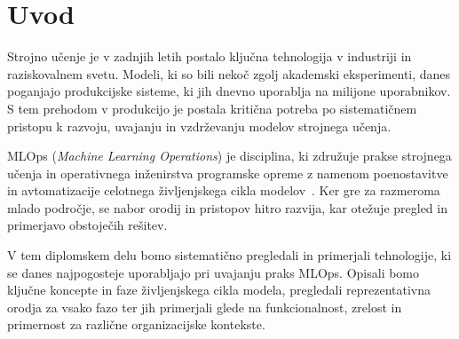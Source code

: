 \chapter{Uvod}

Strojno učenje je v zadnjih letih postalo ključna tehnologija v industriji in raziskovalnem svetu.
Modeli, ki so bili nekoč zgolj akademski eksperimenti, danes poganjajo produkcijske sisteme, ki jih
dnevno uporablja na milijone uporabnikov. S tem prehodom v produkcijo je postala kritična potreba
po sistematičnem pristopu k razvoju, uvajanju in vzdrževanju modelov strojnega učenja.

MLOps (\textit{Machine Learning Operations}) je disciplina, ki združuje prakse strojnega učenja in
operativnega inženirstva programske opreme z namenom poenostavitve in avtomatizacije celotnega
življenjskega cikla modelov~\cite{Kreuzberger2023}. Ker gre za razmeroma mlado področje, se nabor
orodij in pristopov hitro razvija, kar otežuje pregled in primerjavo obstoječih rešitev.

V tem diplomskem delu bomo sistematično pregledali in primerjali tehnologije, ki se danes
najpogosteje uporabljajo pri uvajanju praks MLOps. Opisali bomo ključne koncepte in faze
življenjskega cikla modela, pregledali reprezentativna orodja za vsako fazo ter jih primerjali
glede na funkcionalnost, zrelost in primernost za različne organizacijske kontekste.
